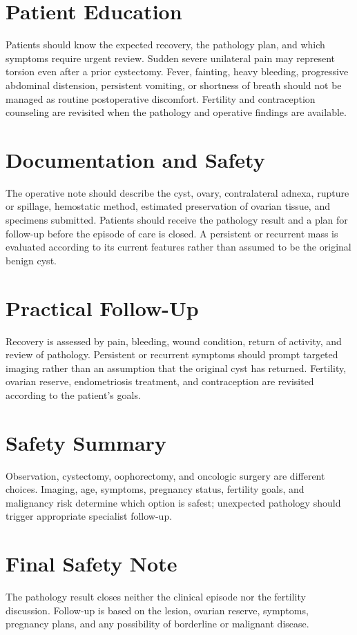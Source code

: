\section*{Patient Education}
Patients should know the expected recovery, the pathology plan, and which symptoms require urgent review. Sudden severe unilateral pain may represent torsion even after a prior cystectomy. Fever, fainting, heavy bleeding, progressive abdominal distension, persistent vomiting, or shortness of breath should not be managed as routine postoperative discomfort. Fertility and contraception counseling are revisited when the pathology and operative findings are available.

\section*{Documentation and Safety}
The operative note should describe the cyst, ovary, contralateral adnexa, rupture or spillage, hemostatic method, estimated preservation of ovarian tissue, and specimens submitted. Patients should receive the pathology result and a plan for follow-up before the episode of care is closed. A persistent or recurrent mass is evaluated according to its current features rather than assumed to be the original benign cyst.

\section*{Practical Follow-Up}
Recovery is assessed by pain, bleeding, wound condition, return of activity, and review of pathology. Persistent or recurrent symptoms should prompt targeted imaging rather than an assumption that the original cyst has returned. Fertility, ovarian reserve, endometriosis treatment, and contraception are revisited according to the patient's goals.

\section*{Safety Summary}
Observation, cystectomy, oophorectomy, and oncologic surgery are different choices. Imaging, age, symptoms, pregnancy status, fertility goals, and malignancy risk determine which option is safest; unexpected pathology should trigger appropriate specialist follow-up.

\section*{Final Safety Note}
The pathology result closes neither the clinical episode nor the fertility discussion. Follow-up is based on the lesion, ovarian reserve, symptoms, pregnancy plans, and any possibility of borderline or malignant disease.

